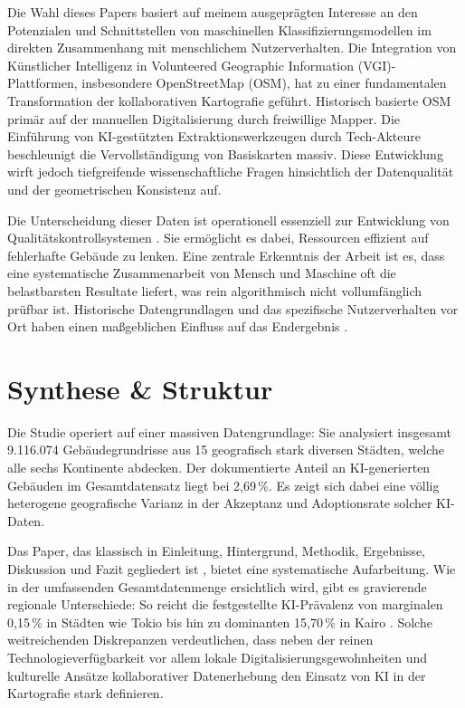 \documentclass[12pt,twoside=false,a4paper,parskip]{scrbook}
\begin{document}
Die Wahl dieses Papers basiert auf meinem ausgeprägten Interesse an den Potenzialen und Schnittstellen von maschinellen Klassifizierungsmodellen im direkten Zusammenhang mit menschlichem Nutzerverhalten. Die Integration von Künstlicher Intelligenz in Volunteered Geographic Information (VGI)-Plattformen, insbesondere OpenStreetMap (OSM), hat zu einer fundamentalen Transformation der kollaborativen Kartografie geführt. Historisch basierte OSM primär auf der manuellen Digitalisierung durch freiwillige Mapper. Die Einführung von KI-gestützten Extraktionswerkzeugen durch Tech-Akteure beschleunigt die Vervollständigung von Basiskarten massiv. Diese Entwicklung wirft jedoch tiefgreifende wissenschaftliche Fragen hinsichtlich der Datenqualität und der geometrischen Konsistenz auf.

Die Unterscheidung dieser Daten ist operationell essenziell zur Entwicklung von Qualitätskontrollsystemen \cite[S.~2]{memduhoglu2026ml}. Sie ermöglicht es dabei, Ressourcen effizient auf fehlerhafte Gebäude zu lenken. Eine zentrale Erkenntnis der Arbeit ist es, dass eine systematische Zusammenarbeit von Mensch und Maschine oft die belastbarsten Resultate liefert, was rein algorithmisch nicht vollumfänglich prüfbar ist. Historische Datengrundlagen und das spezifische Nutzerverhalten vor Ort haben einen maßgeblichen Einfluss auf das Endergebnis \cite[S.~2]{memduhoglu2026ml}.


\chapter{Synthese \& Struktur} \label{sec:synthese}

Die Studie operiert auf einer massiven Datengrundlage: Sie analysiert insgesamt 9.116.074 Gebäudegrundrisse aus 15 geografisch stark diversen Städten, welche alle sechs Kontinente abdecken. Der dokumentierte Anteil an KI-generierten Gebäuden im Gesamtdatensatz liegt bei 2,69\,\%. Es zeigt sich dabei eine völlig heterogene geografische Varianz in der Akzeptanz und Adoptionsrate solcher KI-Daten.

Das Paper, das klassisch in Einleitung, Hintergrund, Methodik, Ergebnisse, Diskussion und Fazit gegliedert ist \cite[S.~5]{memduhoglu2026ml}, bietet eine systematische Aufarbeitung. Wie in der umfassenden Gesamtdatenmenge ersichtlich wird, gibt es gravierende regionale Unterschiede: So reicht die festgestellte KI-Prävalenz von marginalen 0,15\,\% in Städten wie Tokio bis hin zu dominanten 15,70\,\% in Kairo \cite[S.~5]{memduhoglu2026ml}. Solche weitreichenden Diskrepanzen verdeutlichen, dass neben der reinen Technologieverfügbarkeit vor allem lokale Digitalisierungsgewohnheiten und kulturelle Ansätze kollaborativer Datenerhebung den Einsatz von KI in der Kartografie stark definieren.
\end{document}
